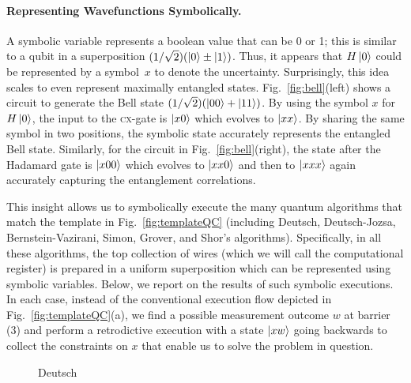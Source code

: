 \documentclass{article}
\newcommand{\cx}{\textsc{cx}}
\begin{document}
\paragraph*{Representing Wavefunctions Symbolically.}
A symbolic variable represents a boolean value that can be 0 or 1;
this is similar to a qubit in a superposition $(1/\sqrt{2}) (\ket{0}
\pm \ket{1})$. Thus, it appears that $H\ket{0}$ could be represented
by a symbol~$x$ to denote the uncertainty. Surprisingly, this idea
scales to even represent maximally entangled
states. Fig.~\ref{fig:bell}(left) shows a circuit to generate the Bell
state $(1/\sqrt{2}) (\ket{00} + \ket{11})$. By using the symbol $x$
for $H\ket{0}$, the input to the \cx-gate is $\ket{x0}$ which
evolves to $\ket{xx}$. By sharing the same symbol in two positions,
the symbolic state accurately represents the entangled Bell
state. Similarly, for the circuit in Fig.~\ref{fig:bell}(right), the
state after the Hadamard gate is $\ket{x00}$ which evolves to
$\ket{xx0}$ and then to $\ket{xxx}$ again accurately capturing the
entanglement correlations.

This insight allows us to symbolically execute the many quantum
algorithms that match the template in Fig.~\ref{fig:templateQC}
(including Deutsch, Deutsch-Jozsa, Bernstein-Vazirani, Simon, Grover,
and Shor's algorithms). Specifically, in all these algorithms, the top
collection of wires (which we will call the computational register) is
prepared in a uniform superposition which can be represented using
symbolic variables. Below, we report on the results of such symbolic
executions. In each case, instead of the conventional execution flow
depicted in Fig.~\ref{fig:templateQC}(a), we find a possible
measurement outcome $w$ at barrier (3) and perform a retrodictive
execution with a state $\ket{xw}$ going backwards to collect the
constraints on $x$ that enable us to solve the problem in question.

\begin{wrapfigure}{r}{4cm}
\caption{\label{fig:deutsch}Deutsch}
\end{wrapfigure}
\end{document}
